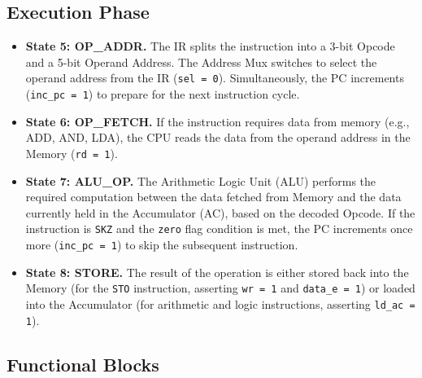 \subsection{Execution Phase}
\begin{itemize}
	\item \textbf{State 5: OP\_ADDR.} The IR splits the instruction into a 3-bit Opcode and a 5-bit Operand Address. The Address Mux switches to select the operand address from the IR (\texttt{sel = 0}). Simultaneously, the PC increments (\texttt{inc\_pc = 1}) to prepare for the next instruction cycle.
	\item \textbf{State 6: OP\_FETCH.} If the instruction requires data from memory (e.g., ADD, AND, LDA), the CPU reads the data from the operand address in the Memory (\texttt{rd = 1}).
	\item \textbf{State 7: ALU\_OP.} The Arithmetic Logic Unit (ALU) performs the required computation between the data fetched from Memory and the data currently held in the Accumulator (AC), based on the decoded Opcode. If the instruction is \texttt{SKZ} and the \texttt{zero} flag condition is met, the PC increments once more (\texttt{inc\_pc = 1}) to skip the subsequent instruction.
	\item \textbf{State 8: STORE.} The result of the operation is either stored back into the Memory (for the \texttt{STO} instruction, asserting \texttt{wr = 1} and \texttt{data\_e = 1}) or loaded into the Accumulator (for arithmetic and logic instructions, asserting \texttt{ld\_ac = 1}).
\end{itemize}

\subsection{Functional Blocks}
